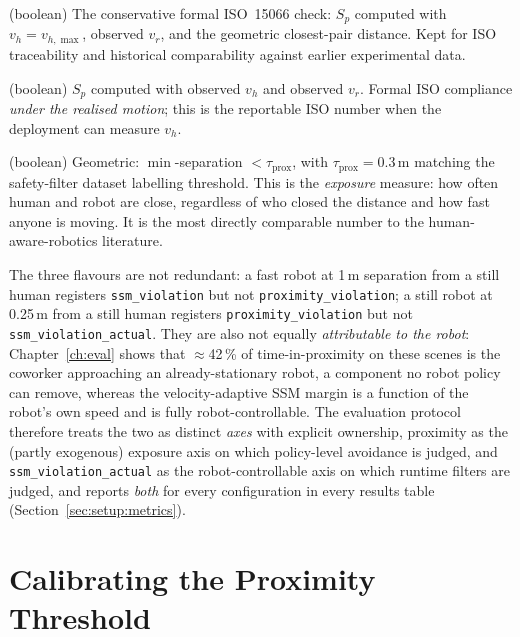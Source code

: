 \documentclass[11pt,a4paper]{report}
\newcommand{\ssm}{SSM}
\newcommand{\iso}{ISO~15066}
\begin{document}
\begin{description}[leftmargin=2em]
\item[\texttt{ssm\_violation}] (boolean) The conservative formal
  \iso{} check: $S_p$ computed with $v_h = v_{h,\max}$, observed
  $v_r$, and the geometric closest-pair distance. Kept for ISO
  traceability and historical comparability against earlier
  experimental data.
\item[\texttt{ssm\_violation\_actual}] (boolean) $S_p$ computed
  with observed $v_h$ and observed $v_r$. Formal ISO compliance
  \emph{under the realised motion}; this is the reportable ISO
  number when the deployment can measure $v_h$.
\item[\texttt{proximity\_violation}] (boolean) Geometric: $\min$-separation
  $< \tau_{\mathrm{prox}}$, with $\tau_{\mathrm{prox}} = 0.3$\,m
  matching the safety-filter dataset labelling threshold.
  This is the \emph{exposure} measure: how often human and robot are
  close, regardless of who closed the distance and how fast anyone
  is moving. It is the most directly comparable number to the
  human-aware-robotics literature.
\end{description}

The three flavours are not redundant: a fast robot at 1\,m
separation from a still human registers \texttt{ssm\_violation} but
not \texttt{proximity\_violation}; a still robot at 0.25\,m from a
still human registers \texttt{proximity\_violation} but not
\texttt{ssm\_violation\_actual}. They are also not equally
\emph{attributable to the robot}: Chapter~\ref{ch:eval} shows that
$\approx$42\,\% of time-in-proximity on these scenes is the coworker
approaching an already-stationary robot, a component no robot policy
can remove, whereas the velocity-adaptive \ssm{} margin is a function
of the robot's own speed and is fully robot-controllable. The
evaluation protocol therefore treats the two as distinct \emph{axes}
with explicit ownership, proximity as the (partly exogenous)
exposure axis on which policy-level avoidance is judged, and
\texttt{ssm\_violation\_actual} as the robot-controllable axis on
which runtime filters are judged, and reports \emph{both} for every
configuration in every results table
(Section~\ref{sec:setup:metrics}).

\section{Calibrating the Proximity Threshold}
\label{sec:bench:proximity-threshold}
\end{document}
